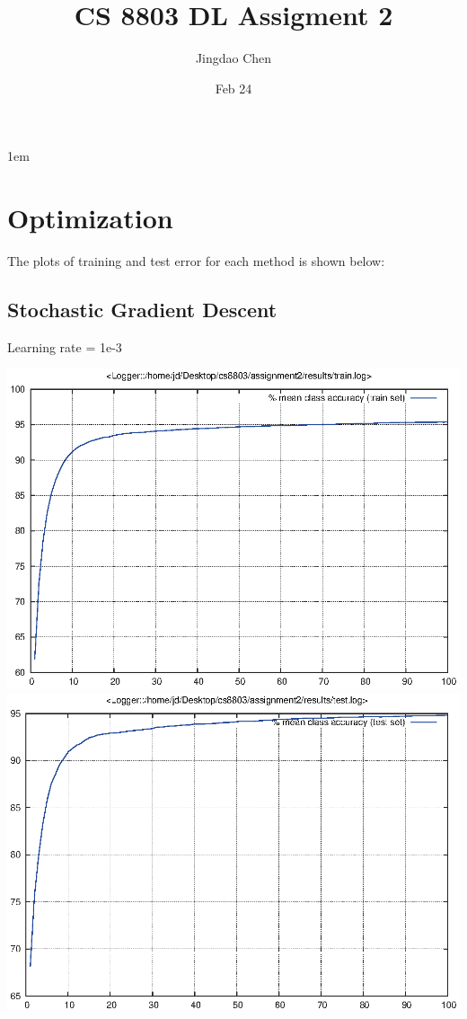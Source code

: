 \documentclass[twoside,12pt]{article}
\newcommand{\imsize}{0.5\linewidth}
\begin{document}
\title{CS 8803 DL Assigment 2}
\author{Jingdao Chen}
\date{Feb 24}
\maketitle
\openup 1em

\section{Optimization}

The plots of training and test error for each method is shown below:

\subsection{Stochastic Gradient Descent}

Learning rate = 1e-3

\includegraphics[width=\imsize]{assignment2/results/sgd_train}
\includegraphics[width=\imsize]{assignment2/results/sgd_test}
\end{document}
